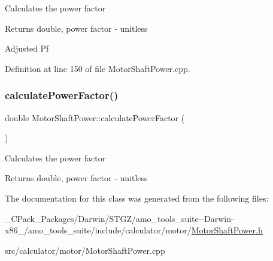 Calculates the power factor

\begin{DoxyReturn}{Returns}
double, power factor -\/ unitless 
\end{DoxyReturn}
Adjusted Pf 

Definition at line 150 of file Motor\+Shaft\+Power.\+cpp.

\mbox{\label{class_motor_shaft_power_aa7e9eb3a219c86f0ee0fb5b3d733b60a}} 
\subsubsection{\texorpdfstring{calculate\+Power\+Factor()}{calculatePowerFactor()}\hspace{0.1cm}{\footnotesize\ttfamily [3/3]}}
{\footnotesize\ttfamily double Motor\+Shaft\+Power\+::calculate\+Power\+Factor (\begin{DoxyParamCaption}{ }\end{DoxyParamCaption})}

Calculates the power factor

\begin{DoxyReturn}{Returns}
double, power factor -\/ unitless 
\end{DoxyReturn}


The documentation for this class was generated from the following files\+:\begin{DoxyCompactItemize}
\item 
\+\_\+\+C\+Pack\+\_\+\+Packages/\+Darwin/\+S\+T\+G\+Z/amo\+\_\+tools\+\_\+suite-\/-\/\+Darwin-\/x86\+\_/amo\+\_\+tools\+\_\+suite/include/calculator/motor/\hyperlink{___c_pack___packages_2_darwin_2_s_t_g_z_2amo__tools__suite--_darwin-x86__64_2amo__tools__suite_25a2bab1d3b39e40805901bac3991bdf5}{Motor\+Shaft\+Power.\+h}\item 
src/calculator/motor/Motor\+Shaft\+Power.\+cpp\end{DoxyCompactItemize}
